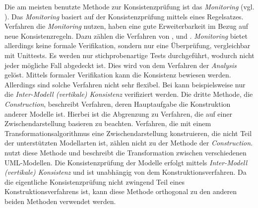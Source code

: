 Die am meisten benutzte Methode zur Konsistenzprüfung ist das \emph{Monitoring} (vgl. \cite{Usman2008}).
Das \emph{Monitoring} basiert auf der Konsistenzprüfung mittels eines Regelsatzes. 
Verfahren die \emph{Monitoring} nutzen, haben eine gute Erweiterbarkeit im Bezug auf neue Konsistenzregeln.
Dazu zählen die Verfahren von \cite{Rasch2003}, \cite{Mens2005} und \cite{Egyed2006}.
\emph{Monitoring} bietet allerdings keine formale Verifikation, sondern nur eine Überprüfung, vergleichbar mit Unittests.
Es werden nur stichprobenartige Tests durchgeführt, wodurch nicht jeder mögliche Fall abgedeckt ist.
Dies wird von dem Verfahren der \emph{Analysis} gelöst.
Mittels formaler Verifikation kann die Konsistenz bewiesen werden.
Allerdings sind solche Verfahren nicht sehr flexibel.
Bei \cite{Shinkawa2006} kann beispielsweise nur die \emph{Inter-Modell (vertikale) Konsistenz} verifiziert werden.
Die dritte Methode, die \emph{Construction}, beschreibt Verfahren, deren Hauptaufgabe die Konstruktion anderer Modelle ist.
Hierbei ist die Abgrenzung zu Verfahren, die auf einer Zwischendarstellung basieren zu beachten.
Verfahren, die mit einem Transformationsalgorithmus eine Zwischendarstellung konstruieren, die nicht Teil der unterstützten Modellarten ist, zählen nicht zu der Methode der \emph{Construction}.
\cite{Egyed2001} nutzt diese Methode und beschreibt die Transformation zwischen verschiedenen UML-Modellen.
Die Konsistenzprüfung der Modelle erfolgt mittels \emph{Inter-Modell (vertikale) Konsistenz} und ist unabhängig von dem Konstruktionsverfahren.
Da die eigentliche Konsistenzprüfung nicht zwingend Teil eines Konstruktionsverfahrens ist, kann diese Methode orthogonal zu den anderen beiden Methoden verwendet werden.
